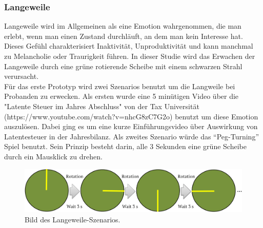 \subsubsection{Langeweile} \label{langeweile-1}


Langeweile wird im Allgemeinen als eine Emotion wahrgenommen, die man erlebt, wenn man einen Zustand durchläuft, an dem man kein Interesse hat\cite{vodanovich_2003}. 
Dieses Gefühl charakterisiert Inaktivität, Unproduktivität und kann manchmal zu Melancholie oder Traurigkeit führen.
In dieser Studie wird das Erwachen der Langeweile durch eine grüne rotierende Scheibe mit einem schwarzen Strahl verursacht. \\

Für das erste Prototyp wird zwei Szenarios benutzt um die Langweile bei Probanden zu erwecken.
Als ersten wurde eine 5 minütigen Video über die "Latente Steuer im Jahres Abschluss" von der Tax Universität (https://www.youtube.com/watch?v=nhcG8zC7G2o) benutzt um diese Emotion auszulösen. 
Dabei ging es um eine kurze Einführungsvideo über Auswirkung von Latentesteuer in der Jahresbilanz.
Als zweites Szenario würde das ``Peg-Turning'' Spiel benutzt. 
Sein Prinzip besteht darin, alle 3 Sekunden eine grüne Scheibe durch ein Mausklick zu drehen. \\



\begin{figure}[H] \centering
\includegraphics[width=\textwidth]{Images/boredom_game2.png} 
\vspace{-0.3cm} 
\caption{Bild des Langeweile-Szenarios.}
\label{fig-glueck} 
\end{figure}

